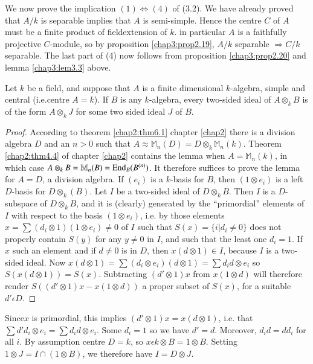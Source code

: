     We now prove the implication $(1) \Leftrightarrow (4)$ of
    (3.2). We have already proved that $A/k$ is separable implies that
    $A$ is semi-simple. Hence the centre $C$ of $A$ must be a finite
    product of field\pageoriginale extension of $k$. in particular $A$ is a
    faithfully projective $C$-module, so by proposition
    \ref{chap3:prop2.19}, $A/k$ 
    separable $\Rightarrow C/k$ separable. The last part of (4)
    now follows from proposition \ref{chap3:prop2.20} and lemma
    \ref{chap3:lem3.3} above.  

    \begin{lemma}\label{chap3:lem3.4} %
Let $k$ be a field, and suppose that  $A$ is a finite dimensional
$k$-algebra, simple and central (i.e.centre $A=k$). If $B$ is any
$k$-algebra, every two-sided ideal of $A \otimes_k B$ is of the form
$A \otimes_k J$ for some two sided ideal $J$ of $B$. 
    \end{lemma}    

\begin{proof}%
According to theorem \ref{chap2:thm6.1} chapter \ref{chap2} there is a
division algebra $D$ 
and an $n >0$ such that $A \approx \mathbb{M}_n (D)= D \otimes_k
\mathbb{M}_n (k)$. Theorem \ref{chap2:thm4.4} of chapter \ref{chap2} contains
the lemma when 
$A= \mathbb{M}_n (k)$, in which case $A \otimes_k B= \mathbb{M}_n (B)
= \operatorname{End}_B(B^{(n)})$. It therefore suffices to prove the lemma for
$A=D$, a division algebra. If $(e_i)$ is a $k$-basis for $B$, then $(1
\otimes e_i)$ is a left $D$-basis for $D \otimes_k (B)$. Let $I$ be a
two-sided ideal of $D \otimes_k B$. Then $I$  is a $D$-subspace of $D
\otimes_k B$, and it is (clearly) generated by the ``primordial''
elements of $I$ with respect to the basis $(1 \otimes e_i)$, i.e. by
those elements $x=  \sum(d_i \otimes 1) ( 1 \otimes e_i) \neq 0$ of
$I$ such that $S(x) = \{i | d_i \neq 0\}$ does not properly contain
$S(y)$ for any $y \neq 0$ in $I$, and such that the least one $d_i
=1$. If $x$ such an element and if $d \neq 0$ is in $D$, then $x(d
\otimes 1 ) \in I$, because $I$ is a two-sided ideal. Now $x(d \otimes
1) = \sum (d_i \otimes e_i) (d \otimes 1) = \sum d_i d \otimes e_i$ so
$S(x(d \otimes 1))= S(x)$. Subtracting $(d' \otimes 1)x$ from
$x(1\otimes d)$
will therefore render $S((d' \otimes 1) x-x(1 \otimes d))$ a proper
subset of $S(x)$, for a suitable $d'  \epsilon D$. 
    \end{proof}    
    
    Since\pageoriginale $x$ is primordial, this implies $(d' \otimes 1) x=x(d
    \otimes 1)$, i.e. that $\sum d' d_i \otimes e_i = \sum d_i d
    \otimes e_i$. Some $d_i =1$ so we have $d' = d$. Moreover, $d_i  d
    = dd_i$ for all $i$. By assumption centre $D =k$, so $x \epsilon k
    \otimes B= 1 \otimes B$. Setting $1 \otimes J = I\cap(1 \otimes
    B)$, we therefore have $I= D \otimes J$. 
    

